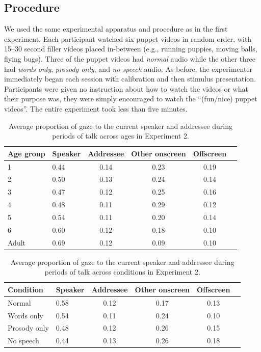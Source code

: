 \documentclass[authoryear, 12pt]{elsarticle}
\begin{document}
\subsection*{Procedure}
We used the same experimental apparatus and procedure as in the first experiment. Each participant watched six puppet videos in random order, with 15--30 second filler videos placed in-between (e.g., running puppies, moving balls, flying bugs). Three of the puppet videos had \textit{normal} audio while the other three had \textit{words only}, \textit{prosody only}, and \textit{no speech} audio. As before, the experimenter immediately began each session with calibration and then stimulus presentation. Participants were given no instruction about how to watch the videos or what their purpose was, they were simply encouraged to watch the ``(fun/nice) puppet videos''. The entire experiment took less than five minutes.

\linespread{1}
\begin{table}[t]
\begin{center}
  \begin{tabular}{llcccc}
    \hline
    Age group & Speaker & Addressee & Other onscreen & Offscreen\\
    \hline
    1 & 0.44 & 0.14 & 0.23 & 0.19 \\
    2 & 0.50 & 0.13 & 0.24 & 0.14 \\
    3 & 0.47 & 0.12 & 0.25 & 0.16 \\
    4 & 0.48 & 0.11 & 0.29 & 0.12 \\
    5 & 0.54 & 0.11 & 0.20 & 0.14 \\
    6 & 0.60 & 0.12 & 0.18 & 0.10 \\
    Adult & 0.69 & 0.12 & 0.09 & 0.10 \\
    \hline
  \end{tabular}
\end{center}
  \caption{Average proportion of gaze to the current speaker and addressee during periods of talk across ages in Experiment 2.}
\label{tab:look_e2}
\end{table}

\linespread{1}
\begin{table}
\begin{center}
  \begin{tabular}{llcccc}
    \hline
    Condition & Speaker & Addressee & Other onscreen & Offscreen\\
    \hline
    Normal 			& 0.58 & 0.12 & 0.17 & 0.13 \\
    Words only 		& 0.54 & 0.11 & 0.24 & 0.10 \\
    Prosody only 	& 0.48 & 0.12 & 0.26 & 0.15 \\
    No speech 		& 0.44 & 0.13 & 0.26 & 0.18 \\
    \hline
  \end{tabular}
\end{center}
  \caption{Average proportion of gaze to the current speaker and addressee during periods of talk across conditions in Experiment 2.}
\label{tab:look_e2b}
\end{table}
\end{document}
